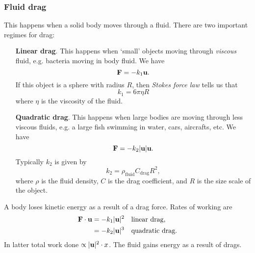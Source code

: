 \subsubsection{Fluid drag}
This happens when a solid body moves through a fluid. There are two important regimes for drag:
\begin{enumerate}[align=left]
    \item[\textbf{Linear drag}.] This happens when `small' objects moving through \textit{viscous} fluid, e.g. bacteria moving in body fluid. We have 
    \[
        \mathbf{F} = -k_1{\bf u}.
    \]
    If this object is a sphere with radius $R$, then \textit{Stokes force law} tells us that
    \[
        k_1 = 6\pi \eta R
    \]
    where $\eta$ is the viscosity of the fluid.
    \item[\textbf{Quadratic drag}.] This happens when large bodies are moving through less viscous fluids, e.g. a large fish swimming in water, cars, aircrafts, etc. We have 
    \[
        \mathbf{F} = -k_2 |{\bf u}|{\bf u}.
    \]
    Typically $k_2$ is given by 
    \[
        k_2 = \rho_{\text{fluid}}C_{\text{drag}}R^2,
    \]
    where $ \rho $ is the fluid density, $C$ is the drag coefficient, and $R$ is the size scale of the object.
\end{enumerate}

A body loses kinetic energy as a result of a drag force. Rates of working are 
\begin{align*}
    {\bf F}\cdot{\bf u} &= -k_1|{\bf u}|^2\quad \text{linear drag,}\\
    &= -k_2|{\bf u}|^3\quad \text{quadratic drag.} 
\end{align*}
In latter total work done $ \propto |{\bf u}|^2\cdot x $. The fluid gains energy as a result of drags.

